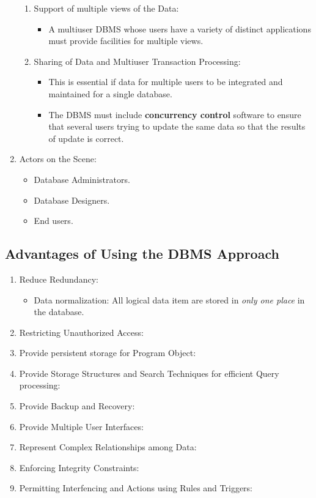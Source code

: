 \documentclass[10pt]{article}
\begin{document}
\begin{enumerate}
\begin{enumerate}
		\item Support of multiple views of the Data: 
		\begin{itemize}
			\item A multiuser DBMS whose users have a variety of distinct applications must provide facilities for multiple views.
		\end{itemize}

		\item Sharing of Data and Multiuser Transaction Processing: 
		\begin{itemize}
			\item This is essential if data for multiple users to be integrated and maintained for a single database.
			\item The DBMS must include \textbf{concurrency control} software to ensure that several users trying to update the same data so that the results of update is correct.
		\end{itemize} 
	\end{enumerate}

	\item Actors on the Scene:
	\begin{itemize}
		\item Database Administrators.
		\item Database Designers.
		\item End users.
	\end{itemize}
\end{enumerate}

\subsection{Advantages of Using the DBMS Approach}
\begin{enumerate}
	\item Reduce Redundancy:
	\begin{itemize}
		\item Data normalization: All logical data item are stored in \textit{only one place} in the database.
	\end{itemize} 

	\item Restricting Unauthorized Access:
	\item Provide persistent storage for Program Object:
	\item Provide Storage Structures and Search Techniques for efficient Query processing:
	\item Provide Backup and Recovery:
	\item Provide Multiple User Interfaces:
	\item Represent Complex Relationships among Data:
	\item Enforcing Integrity Constraints:
	\item Permitting Interfencing and Actions using Rules and Triggers:
\end{enumerate}
\end{document}
